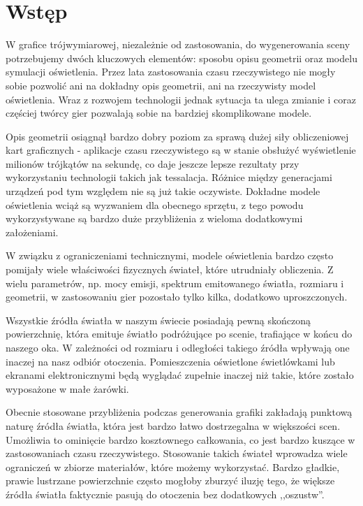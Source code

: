 \documentclass[../main.tex]{subfiles}
\begin{document}
\chapter*{Wstęp}

W grafice trójwymiarowej, niezależnie od zastosowania, do wygenerowania sceny potrzebujemy dwóch kluczowych elementów: sposobu opisu geometrii oraz modelu symulacji oświetlenia. Przez lata zastosowania czasu rzeczywistego nie mogły sobie pozwolić ani na dokładny opis geometrii, ani na rzeczywisty model oświetlenia. Wraz z rozwojem technologii jednak sytuacja ta ulega zmianie i coraz częściej twórcy gier pozwalają sobie na bardziej skomplikowane modele.

Opis geometrii osiągnął bardzo dobry poziom za sprawą dużej siły obliczeniowej kart graficznych - aplikacje czasu rzeczywistego są w stanie obsłużyć wyświetlenie milionów trójkątów na sekundę, co daje jeszcze lepsze rezultaty przy wykorzystaniu technologii takich jak tessalacja. Różnice między generacjami urządzeń pod tym względem nie są już takie oczywiste. Dokładne modele oświetlenia wciąż są wyzwaniem dla obecnego sprzętu, z tego powodu wykorzystywane są bardzo duże przybliżenia z wieloma dodatkowymi założeniami.

W związku z ograniczeniami technicznymi, modele oświetlenia bardzo często pomijały wiele właściwości fizycznych świateł, które utrudniały obliczenia. Z wielu parametrów, np. mocy emisji, spektrum emitowanego światła, rozmiaru i geometrii, w zastosowaniu gier pozostało tylko kilka, dodatkowo uproszczonych.

Wszystkie źródła światła w naszym świecie posiadają pewną skończoną powierzchnię, która emituje światło podróżujące po scenie, trafiające w końcu do naszego oka. W zależności od rozmiaru i odległości takiego źródła wpływają one inaczej na nasz odbiór otoczenia. Pomieszczenia oświetlone świetlówkami lub ekranami elektronicznymi będą wyglądać zupełnie inaczej niż takie, które zostało wyposażone w małe żarówki.

Obecnie stosowane przybliżenia podczas generowania grafiki zakładają punktową naturę źródła światła, która jest bardzo łatwo dostrzegalna w większości scen. Umożliwia to ominięcie bardzo kosztownego całkowania, co jest bardzo kuszące w zastosowaniach czasu rzeczywistego. Stosowanie takich świateł wprowadza wiele ograniczeń w zbiorze materiałów, które możemy wykorzystać. Bardzo gładkie, prawie lustrzane powierzchnie często mogłoby zburzyć iluzję tego, że większe źródła światła faktycznie pasują do otoczenia bez dodatkowych ,,oszustw''.
\end{document}
